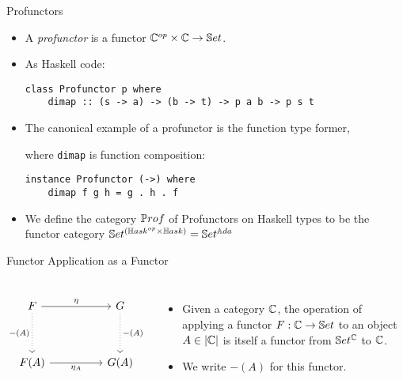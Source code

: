 \begin{frame}[fragile]{Profunctors}
	\begin{itemize}
		\item A \textit{profunctor} is a functor $\mathbb{C}^{op} \times \mathbb{C} \to \mathbb{S}et$.
		\pause\item As Haskell code:
		\begin{lstlisting}
class Profunctor p where
	dimap :: (s -> a) -> (b -> t) -> p a b -> p s t
		\end{lstlisting}
		\pause\item The canonical example of a profunctor is the function type former, 
		
		where \texttt{dimap} is function composition:
		\begin{lstlisting}
instance Profunctor (->) where
	dimap f g h = g . h . f
		\end{lstlisting}
		\pause\item We define the category ${\mathbb{P}rof}$ of Profunctors on Haskell types to be the functor category $\mathbb{S}et^{(\mathbb{H}ask^{op} \times \mathbb{H}ask)} = \mathbb{S}et^{\mathbb{A}da}$
	\end{itemize}
\end{frame}
\begin{frame}[fragile]{Functor Application as a Functor}
	\begin{columns}
		\[\begin{tikzcd}
			F && G \\
			\\
			{F(A)} && {G(A)}
			\arrow["{\eta}", from=1-1, to=1-3]
			\arrow["{-(A)}"', dotted, from=1-1, to=3-1]
			\arrow["{-(A)}", dotted, from=1-3, to=3-3]
			\arrow["{\eta_A}"', from=3-1, to=3-3]
		\end{tikzcd}\]
		\begin{itemize}
			\item Given a category $\mathbb{C}$, the operation of applying a functor $F : \mathbb{C} \to \mathbb{S}et$ to an object $A \in |\mathbb{C}|$ is itself a functor from $\mathbb{S}et^{\mathbb{C}}$ to $\mathbb{C}$.
			\pause\item We write $-(A)$ for this functor.
		\end{itemize}
	\end{columns}
\end{frame}
